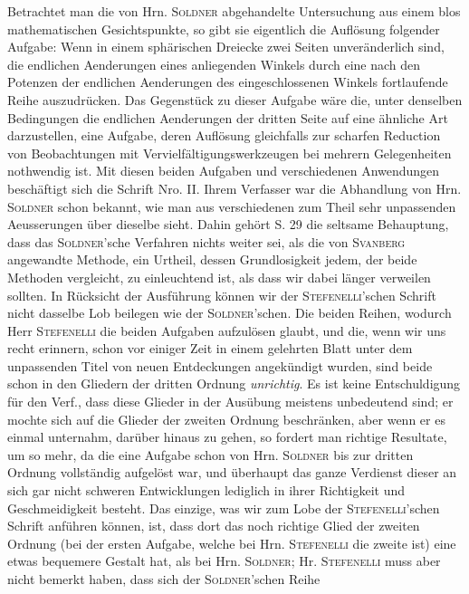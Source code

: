 Betrachtet man die von Hrn. \textsc{Soldner} abgehandelte Untersuchung aus einem blos mathematischen Gesichtspunkte, so gibt sie eigentlich die Auflösung folgender Aufgabe: Wenn in einem sphärischen Dreiecke zwei Seiten unveränderlich sind, die endlichen Aenderungen eines anliegenden Winkels durch eine nach den Potenzen der endlichen Aenderungen des eingeschlossenen Winkels fortlaufende Reihe auszudrücken. Das Gegenstück zu dieser Aufgabe wäre die, unter denselben Bedingungen die endlichen Aenderungen der dritten Seite auf eine ähnliche Art darzustellen, eine Aufgabe, deren Auflösung gleichfalls zur scharfen Reduction von Beobachtungen mit Vervielfältigungswerkzeugen bei mehrern Gelegenheiten nothwendig ist. Mit diesen beiden Aufgaben und verschiedenen Anwendungen beschäftigt sich die Schrift Nro. II. Ihrem Verfasser war die Abhandlung von Hrn. \textsc{Soldner} schon bekannt, wie man aus verschiedenen zum Theil sehr unpassenden Aeusserungen über dieselbe sieht. Dahin gehört S. 29 die seltsame Behauptung, dass das \textsc{Soldner}'sche Verfahren nichts weiter sei, als die von \textsc{Svanberg} angewandte Methode, ein Urtheil, dessen Grundlosigkeit jedem, der beide Methoden vergleicht, zu einleuchtend ist, als dass wir dabei länger verweilen sollten. In Rücksicht der Ausführung können wir der \textsc{Stefenelli}'schen Schrift nicht dasselbe Lob beilegen wie der \textsc{Soldner}'schen. Die beiden Reihen, wodurch Herr \textsc{Stefenelli} die beiden Aufgaben aufzulösen glaubt, und die, wenn wir uns recht erinnern, schon vor einiger Zeit in einem gelehrten Blatt unter dem unpassenden Titel von neuen Entdeckungen angekündigt wurden, sind beide schon in den Gliedern der dritten Ordnung \emph{unrichtig}. Es ist keine Entschuldigung für den Verf., dass diese Glieder in der Ausübung meistens unbedeutend sind; er mochte sich auf die Glieder der zweiten Ordnung beschränken, aber wenn er es einmal unternahm, darüber  hinaus zu gehen, so fordert man richtige Resultate, um so mehr, da die eine Aufgabe schon von Hrn.
\textsc{Soldner} bis zur dritten Ordnung vollständig aufgelöst war, und überhaupt das ganze Verdienst
dieser an sich gar nicht schweren Entwicklungen lediglich in ihrer Richtigkeit und Geschmeidigkeit
besteht. Das einzige, was wir zum Lobe der \textsc{Stefenelli}'schen Schrift anführen können, ist,
dass dort das noch richtige Glied der zweiten Ordnung (bei der ersten Aufgabe, welche bei Hrn.
\textsc{Stefenelli} die zweite ist) eine etwas bequemere Gestalt hat, als bei Hrn. \textsc{Soldner};
Hr. \textsc{Stefenelli} muss aber nicht bemerkt haben, dass sich der \textsc{Soldner}'schen Reihe
